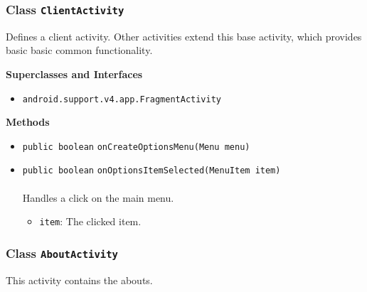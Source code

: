 \subsubsection{Class \lstinline|ClientActivity|}
Defines a client activity. Other activities extend this base activity, which provides basic
 basic common functionality. \\
\noindent\begin{minipage}[t]{5cm}
\vspace{0.3em}
\hspace*{2em}
\vspace{0.3em}
\end{minipage}



\textbf{\sffamily Superclasses and Interfaces}
\begin{itemize}
\item \lstinline|android.support.v4.app.FragmentActivity|
\end{itemize}



\textbf{\sffamily Methods}
\begin{itemize}
\item \lstinline|public boolean| \lstinline|onCreateOptionsMenu|\lstinline|(Menu menu)| \\[-0.6em]




\item \lstinline|public boolean| \lstinline|onOptionsItemSelected|\lstinline|(MenuItem item)|\\ \\[-0.6em]
Handles a click on the main menu.
\begin{itemize}
\item \lstinline|item|: The clicked item.
\end{itemize}



\end{itemize}

\subsubsection{Class \lstinline|AboutActivity|}
This activity contains the abouts. \\
\noindent\begin{minipage}[t]{5cm}
\vspace{0.3em}
\hspace*{2em}
\vspace{0.3em}
\end{minipage}



